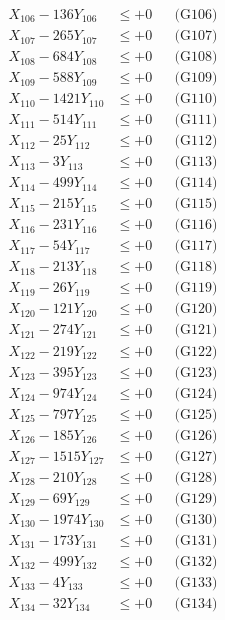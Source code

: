 \documentclass[a4paper,10pt]{article}
\begin{document}
{\begin{align}
X_{106} - 136Y_{106} &\leq +0 && \text{(G106)} \\
X_{107} - 265Y_{107} &\leq +0 && \text{(G107)} \\
X_{108} - 684Y_{108} &\leq +0 && \text{(G108)} \\
X_{109} - 588Y_{109} &\leq +0 && \text{(G109)} \\
X_{110} - 1421Y_{110} &\leq +0 && \text{(G110)} \\
\allowbreak
X_{111} - 514Y_{111} &\leq +0 && \text{(G111)} \\
X_{112} - 25Y_{112} &\leq +0 && \text{(G112)} \\
X_{113} - 3Y_{113} &\leq +0 && \text{(G113)} \\
X_{114} - 499Y_{114} &\leq +0 && \text{(G114)} \\
X_{115} - 215Y_{115} &\leq +0 && \text{(G115)} \\
X_{116} - 231Y_{116} &\leq +0 && \text{(G116)} \\
X_{117} - 54Y_{117} &\leq +0 && \text{(G117)} \\
X_{118} - 213Y_{118} &\leq +0 && \text{(G118)} \\
X_{119} - 26Y_{119} &\leq +0 && \text{(G119)} \\
X_{120} - 121Y_{120} &\leq +0 && \text{(G120)} \\
\allowbreak
X_{121} - 274Y_{121} &\leq +0 && \text{(G121)} \\
X_{122} - 219Y_{122} &\leq +0 && \text{(G122)} \\
X_{123} - 395Y_{123} &\leq +0 && \text{(G123)} \\
X_{124} - 974Y_{124} &\leq +0 && \text{(G124)} \\
X_{125} - 797Y_{125} &\leq +0 && \text{(G125)} \\
X_{126} - 185Y_{126} &\leq +0 && \text{(G126)} \\
X_{127} - 1515Y_{127} &\leq +0 && \text{(G127)} \\
X_{128} - 210Y_{128} &\leq +0 && \text{(G128)} \\
X_{129} - 69Y_{129} &\leq +0 && \text{(G129)} \\
X_{130} - 1974Y_{130} &\leq +0 && \text{(G130)} \\
\allowbreak
X_{131} - 173Y_{131} &\leq +0 && \text{(G131)} \\
X_{132} - 499Y_{132} &\leq +0 && \text{(G132)} \\
X_{133} - 4Y_{133} &\leq +0 && \text{(G133)} \\
X_{134} - 32Y_{134} &\leq +0 && \text{(G134)} \\

\end{align}}
\end{document}
